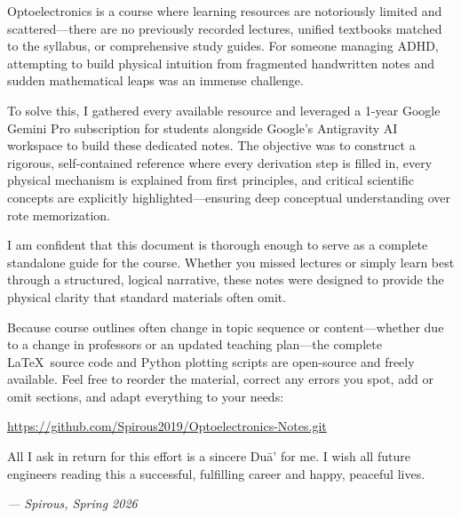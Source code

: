 \documentclass[12pt,oneside,openany]{book}
\begin{document}
\vspace{1.2cm}

\noindent
Optoelectronics is a course where learning resources are notoriously limited and scattered—there are no previously recorded lectures, unified textbooks matched to the syllabus, or comprehensive study guides. For someone managing ADHD, attempting to build physical intuition from fragmented handwritten notes and sudden mathematical leaps was an immense challenge.

\vspace{0.6em}
\noindent
To solve this, I gathered every available resource and leveraged a 1-year Google Gemini Pro subscription for students alongside Google's Antigravity AI workspace to build these dedicated notes. The objective was to construct a rigorous, self-contained reference where every derivation step is filled in, every physical mechanism is explained from first principles, and critical scientific concepts are explicitly highlighted—ensuring deep conceptual understanding over rote memorization.

\vspace{0.6em}
\noindent
I am confident that this document is thorough enough to serve as a complete standalone guide for the course. Whether you missed lectures or simply learn best through a structured, logical narrative, these notes were designed to provide the physical clarity that standard materials often omit.

\vspace{0.6em}
\noindent
Because course outlines often change in topic sequence or content—whether due to a change in professors or an updated teaching plan—the complete \LaTeX\ source code and Python plotting scripts are open-source and freely available. Feel free to reorder the material, correct any errors you spot, add or omit sections, and adapt everything to your needs:

\vspace{0.5em}
\begin{center}
    \url{https://github.com/Spirous2019/Optoelectronics-Notes.git}
\end{center}

\vspace{0.8em}
\noindent
All I ask in return for this effort is a sincere Du\={a}' for me. I wish all future engineers reading this a successful, fulfilling career and happy, peaceful lives.

\vspace{1.5em}
\begin{flushright}
    \textit{— Spirous, Spring 2026}
\end{flushright}
\end{document}
